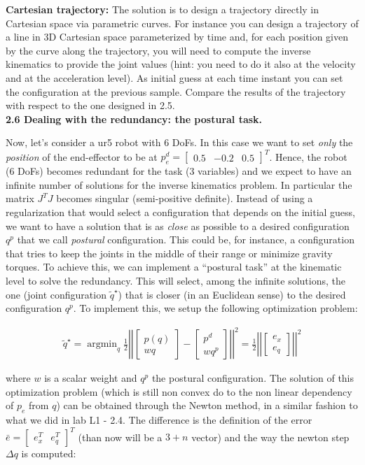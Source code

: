 \documentclass[11pt]{article}
\newcommand{\mat}[1]{\ensuremath{\begin{bmatrix}#1\end{bmatrix}}}	%
\DeclareMathOperator*{\argmin}{argmin}
\begin{document}
\textbf{Cartesian trajectory:} The solution is  to  design a trajectory directly in Cartesian space via parametric curves. For instance you can design a trajectory of a line in 3D Cartesian space parameterized by time and, for each position given by the curve along the trajectory, you will need to compute the inverse kinematics to provide the joint values (hint: you need to do it also at the velocity and at the acceleration level). As initial guess at each time instant you can set the configuration at the previous sample. Compare the results of the trajectory with respect to the one designed in 2.5.\\

\textbf{2.6 Dealing with the redundancy: the postural task.} 

Now, let's consider a ur5 robot with 6 DoFs. In this case we want to set \textit{only} the \textit{position} of the end-effector to be at $p^d_e =\mat{0.5 & -0.2 & 0.5}^T$. Hence, the robot (6 DoFs) becomes redundant for the task (3 variables) and we expect to have an  infinite number of solutions for the inverse kinematics problem. In particular the matrix $J^TJ$ becomes singular (semi-positive definite). Instead of using a regularization that would select a configuration that depends on the initial guess, we want to have a solution that is as  \textit{close} as possible to a desired configuration $q^p$ that we call \textit{postural} configuration. This could be, for instance, a configuration that tries to keep the joints in the middle of their range or minimize gravity torques. To achieve this,  we can implement a ``postural task'' at the kinematic level to solve the redundancy.
This will  select, among the infinite solutions, the one (joint configuration $\tilde{q}^\star$) that is closer (in an Euclidean sense) to the desired configuration $q^p$. 
To implement this, we setup the following optimization problem:

\begin{align*}
\tilde{q}^\star = \argmin_q \frac{1}{2} \left|\left| \mat{p(q) \\ w q } - \mat{p^d \\ w q^p }   \right|\right|^2 = \frac{1}{2} \left|\left| \mat{ e_x \\ e_q }   \right|\right|^2
\end{align*}

where $w$ is a scalar weight and $q^p$ the postural configuration. The solution of this optimization problem (which is still non convex do to the non linear dependency of $p_e$ from $q$) can be obtained through the Newton method, in a similar fashion to what we did in lab L1 - 2.4. The difference is the definition of the error $\bar{e} = \mat{e_x^T & e_q^T}^T$ (than now will be a $3+n$ vector) and the way the newton step $\Delta q$ is computed:
\end{document}
